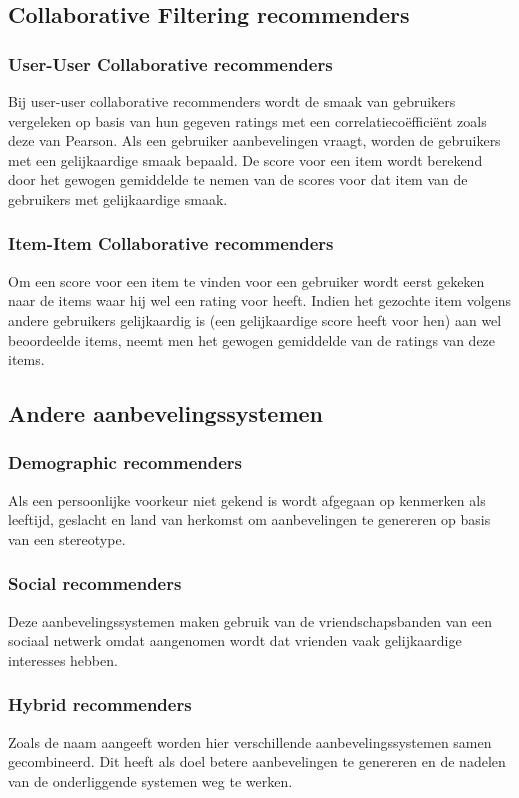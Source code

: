 \subsection{Collaborative Filtering recommenders}
\subsubsection{User-User Collaborative recommenders}
Bij user-user collaborative recommenders wordt de smaak van gebruikers vergeleken op basis van hun gegeven ratings met een  correlatieco\"effici\"ent zoals deze van Pearson. Als een gebruiker aanbevelingen vraagt, worden de gebruikers met een gelijkaardige smaak bepaald. De score voor een item wordt berekend door het gewogen gemiddelde te nemen van de scores voor dat item van de gebruikers met gelijkaardige smaak.
\subsubsection{Item-Item Collaborative recommenders}
Om een score voor een item te vinden voor een gebruiker wordt eerst gekeken naar de items waar hij wel een rating voor heeft. Indien het gezochte item volgens andere gebruikers gelijkaardig is (een gelijkaardige score heeft voor hen) aan wel beoordeelde items, neemt men het gewogen gemiddelde van de ratings van deze items.
\subsection{Andere aanbevelingssystemen}
\subsubsection{Demographic recommenders}
Als een persoonlijke voorkeur niet gekend is wordt afgegaan op kenmerken als leeftijd, geslacht en land van herkomst om aanbevelingen te genereren op basis van een stereotype.
\subsubsection{Social recommenders}
Deze aanbevelingssystemen maken gebruik van de vriendschapsbanden van een sociaal netwerk omdat aangenomen wordt dat vrienden vaak gelijkaardige interesses hebben.
\subsubsection{Hybrid recommenders}
Zoals de naam aangeeft worden hier verschillende aanbevelingssystemen samen gecombineerd. Dit heeft als doel betere aanbevelingen te genereren en de nadelen van de onderliggende systemen weg te werken.

